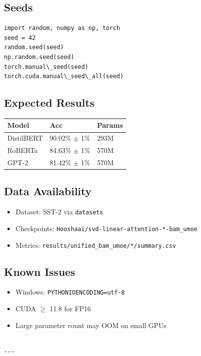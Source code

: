 \subsection{Seeds}

\begin{lstlisting}
import random, numpy as np, torch
seed = 42
random.seed(seed)
np.random.seed(seed)
torch.manual\_seed(seed)
torch.cuda.manual\_seed\_all(seed)
\end{lstlisting}

\subsection{Expected Results}

\begin{table}[H]
\centering
\small
\begin{tabular}{lll}
\toprule
\textbf{Model} & \textbf{Acc} & \textbf{Params} \\
\midrule
DistilBERT & 90.02\% $\pm$ 1\% & 293M \\
RoBERTa & 84.63\% $\pm$ 1\% & 570M \\
GPT-2 & 81.42\% $\pm$ 1\% & 570M \\
\bottomrule
\end{tabular}
\end{table}

\subsection{Data Availability}

\begin{itemize}
\item Dataset: SST-2 via \texttt{datasets}
\item Checkpoints: \texttt{Hooshaai/svd-linear-attention-*-bam\_umoe}
\item Metrics: \texttt{results/unified\_bam\_umoe/*/summary.csv}

\end{itemize}
\subsection{Known Issues}

\begin{itemize}
\item Windows: \texttt{PYTHONIOENCODING=utf-8}
\item CUDA $\ge$ 11.8 for FP16
\item Large parameter count may OOM on small GPUs
\end{itemize}
\begin{lstlisting}

---
\end{lstlisting}